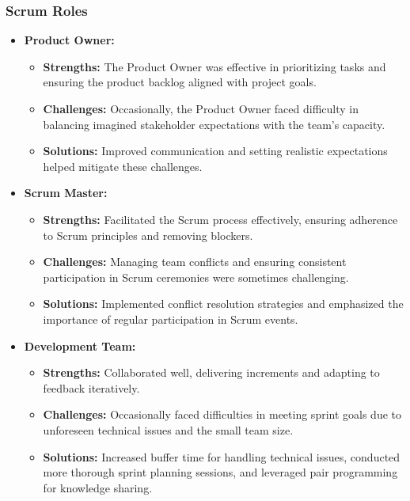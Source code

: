 \documentclass[11pt,a4paper]{article}
\begin{document}
    \subsubsection{Scrum Roles}\label{subsubsec:scrum-roles}
    \begin{itemize}
        \item \textbf{Product Owner:}
        \begin{itemize}
            \item \textbf{Strengths:} The Product Owner was effective in prioritizing tasks and ensuring the product backlog aligned with project goals.
            \item \textbf{Challenges:} Occasionally, the Product Owner faced difficulty in balancing imagined stakeholder expectations with the team's capacity.
            \item \textbf{Solutions:} Improved communication and setting realistic expectations helped mitigate these challenges.
        \end{itemize}
        \item \textbf{Scrum Master:}
        \begin{itemize}
            \item \textbf{Strengths:} Facilitated the Scrum process effectively, ensuring adherence to Scrum principles and removing blockers.
            \item \textbf{Challenges:} Managing team conflicts and ensuring consistent participation in Scrum ceremonies were sometimes challenging.
            \item \textbf{Solutions:} Implemented conflict resolution strategies and emphasized the importance of regular participation in Scrum events.
        \end{itemize}
        \item \textbf{Development Team:}
        \begin{itemize}
            \item \textbf{Strengths:} Collaborated well, delivering increments and adapting to feedback iteratively.
            \item \textbf{Challenges:} Occasionally faced difficulties in meeting sprint goals due to unforeseen technical issues and the small team size.
            \item \textbf{Solutions:} Increased buffer time for handling technical issues, conducted more thorough sprint planning sessions, and leveraged pair programming for knowledge sharing.
        \end{itemize}

\end{itemize}
\end{document}
